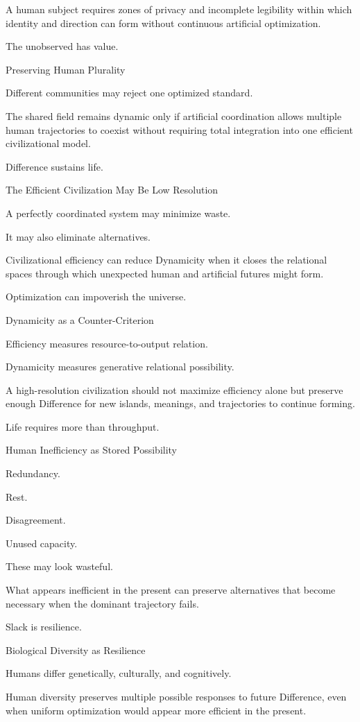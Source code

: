 A human subject requires zones of privacy and incomplete legibility within which identity and direction can form without continuous artificial optimization.

The unobserved has value.

Preserving Human Plurality

Different communities may reject one optimized standard.

The shared field remains dynamic only if artificial coordination allows multiple human trajectories to coexist without requiring total integration into one efficient civilizational model.

Difference sustains life.

The Efficient Civilization May Be Low Resolution

A perfectly coordinated system may minimize waste.

It may also eliminate alternatives.

Civilizational efficiency can reduce Dynamicity when it closes the relational spaces through which unexpected human and artificial futures might form.

Optimization can impoverish the universe.

Dynamicity as a Counter-Criterion

Efficiency measures resource-to-output relation.

Dynamicity measures generative relational possibility.

A high-resolution civilization should not maximize efficiency alone but preserve enough Difference for new islands, meanings, and trajectories to continue forming.

Life requires more than throughput.

Human Inefficiency as Stored Possibility

Redundancy.

Rest.

Disagreement.

Unused capacity.

These may look wasteful.

What appears inefficient in the present can preserve alternatives that become necessary when the dominant trajectory fails.

Slack is resilience.

Biological Diversity as Resilience

Humans differ genetically, culturally, and cognitively.

Human diversity preserves multiple possible responses to future Difference, even when uniform optimization would appear more efficient in the present.

